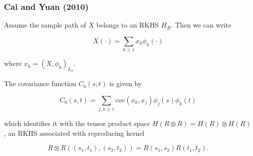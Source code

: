 \documentclass{beamer}
\begin{document}
%
%
%

\begin{frame}\frametitle{Cai and Yuan (2010)}
Assume the sample path of $X$ belongs to an RKHS $H_{R}.$ Then we
can write

\[
X(\cdot)=\sum_{k\geq1}x_{k}\phi_{k}(\cdot)\]


where $x_{k}=(X,\phi_{k})_{L_{2}}$.

The covariance function $C_{0}(s,t)$ is given by

\[
C_{0}(s,t)=\sum_{j,k\geq1}cov(x_{k},x_{j})\phi_{j}(s)\phi_{k}(t)\]


which identifies it with the tensor product space $H(R\otimes R)=H(R)\otimes H(R)$,
an RKHS associated with reproducing kernel

\[
R\otimes R((s_{1},t_{1}),(s_{2},t_{2}))=R(s_{1},s_{2})R(t_{1},t_{2}).\]
\end{frame}

%
%
%
%
%
%
%
\end{document}
